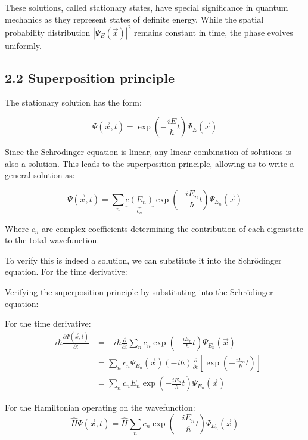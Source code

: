 \documentclass[10pt]{article}
\begin{document}
These solutions, called stationary states, have special significance in quantum mechanics as they represent states of definite energy. While the spatial probability distribution $|\Psi_E(\vec{x})|^2$ remains constant in time, the phase evolves uniformly.

\subsection*{2.2 Superposition principle}

The stationary solution has the form:

\begin{equation*}
\Psi(\vec{x}, t) = \exp\left(-\frac{iE}{\hbar}t\right)\Psi_E(\vec{x}) \tag{2.5}
\end{equation*}

Since the Schrödinger equation is linear, any linear combination of solutions is also a solution. This leads to the superposition principle, allowing us to write a general solution as:

\begin{equation*}
\Psi(\vec{x}, t) = \sum_n \underbrace{c(E_n)}_{c_n}\exp\left(-\frac{iE_n}{\hbar}t\right)\Psi_{E_n}(\vec{x}) \tag{2.6}
\end{equation*}

Where $c_n$ are complex coefficients determining the contribution of each eigenstate to the total wavefunction.

To verify this is indeed a solution, we can substitute it into the Schrödinger equation. For the time derivative:


Verifying the superposition principle by substituting into the Schrödinger equation:

For the time derivative:
\begin{align*}
-i\hbar\frac{\partial\Psi(\vec{x},t)}{\partial t} &= -i\hbar\frac{\partial}{\partial t}\sum_n c_n\exp\left(-\frac{iE_n}{\hbar}t\right)\Psi_{E_n}(\vec{x}) \\
&= \sum_n c_n\Psi_{E_n}(\vec{x})(-i\hbar)\frac{\partial}{\partial t}\left[\exp\left(-\frac{iE_n}{\hbar}t\right)\right] \tag{2.7} \\
&= \sum_n c_nE_n\exp\left(-\frac{iE_n}{\hbar}t\right)\Psi_{E_n}(\vec{x})
\end{align*}

For the Hamiltonian operating on the wavefunction:
\begin{equation*}
\hat{H}\Psi(\vec{x},t) = \hat{H}\sum_n c_n\exp\left(-\frac{iE_n}{\hbar}t\right)\Psi_{E_n}(\vec{x}) \tag{2.8}
\end{equation*}
\end{document}
